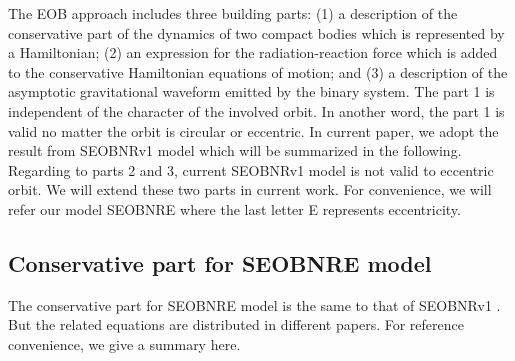 \documentclass[prd,aps,a4paper,superscriptaddress,twocolumn,footinbib,showpacs]{revtex4}
\begin{document}
The EOB approach includes three building parts: (1) a description of the conservative part of the dynamics of two compact bodies which is represented by a Hamiltonian; (2) an expression for the radiation-reaction force which is added to the conservative Hamiltonian equations of motion; and (3) a description of the asymptotic gravitational waveform emitted by the binary system. The part 1 is independent of the character of the involved orbit. In another word, the part 1 is valid no matter the orbit is circular or eccentric. In current paper, we adopt the result from SEOBNRv1 model which will be summarized in the following. Regarding to parts 2 and 3, current SEOBNRv1 model is not valid to eccentric orbit. We will extend these two parts in current work. For convenience, we will refer our model SEOBNRE where the last letter E represents eccentricity.

\subsection{Conservative part for SEOBNRE model}
The conservative part for SEOBNRE model is the same to that of SEOBNRv1 \cite{PhysRevD.86.024011}. But the related equations are distributed in different papers. For reference convenience, we give a summary here.
\end{document}
